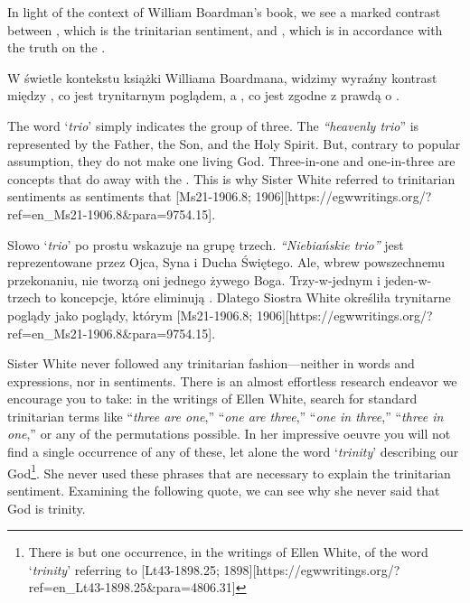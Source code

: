 In light of the context of William Boardman’s book, we see a marked contrast between , which is the trinitarian sentiment, and , which is in accordance with the truth on the .


W świetle kontekstu książki Williama Boardmana, widzimy wyraźny kontrast między , co jest trynitarnym poglądem, a , co jest zgodne z prawdą o .


The word ‘\textit{trio}’ simply indicates the group of three. The \textit{“heavenly trio}” is represented by the Father, the Son, and the Holy Spirit. But, contrary to popular assumption, they do not make one living God. Three-in-one and one-in-three are concepts that do away with the . This is why Sister White referred to trinitarian sentiments as sentiments that [Ms21-1906.8; 1906][https://egwwritings.org/?ref=en\_Ms21-1906.8&para=9754.15].


Słowo ‘\textit{trio}’ po prostu wskazuje na grupę trzech. \textit{“Niebiańskie trio”} jest reprezentowane przez Ojca, Syna i Ducha Świętego. Ale, wbrew powszechnemu przekonaniu, nie tworzą oni jednego żywego Boga. Trzy-w-jednym i jeden-w-trzech to koncepcje, które eliminują . Dlatego Siostra White określiła trynitarne poglądy jako poglądy, którym [Ms21-1906.8; 1906][https://egwwritings.org/?ref=en\_Ms21-1906.8&para=9754.15].


Sister White never followed any trinitarian fashion—neither in words and expressions, nor in sentiments. There is an almost effortless research endeavor we encourage you to take: in the writings of Ellen White, search for standard trinitarian terms like “\textit{three are one},” “\textit{one are three},” “\textit{one in three},” “\textit{three in one},” or any of the permutations possible. In her impressive oeuvre you will not find a single occurrence of any of these, let alone the word ‘\textit{trinity}’ describing our God\footnote{There is but one occurrence, in the writings of Ellen White, of the word ‘\textit{trinity}’ referring to [Lt43-1898.25; 1898][https://egwwritings.org/?ref=en\_Lt43-1898.25&para=4806.31]}. She never used these phrases that are necessary to explain the trinitarian sentiment. Examining the following quote, we can see why she never said that God is trinity.



